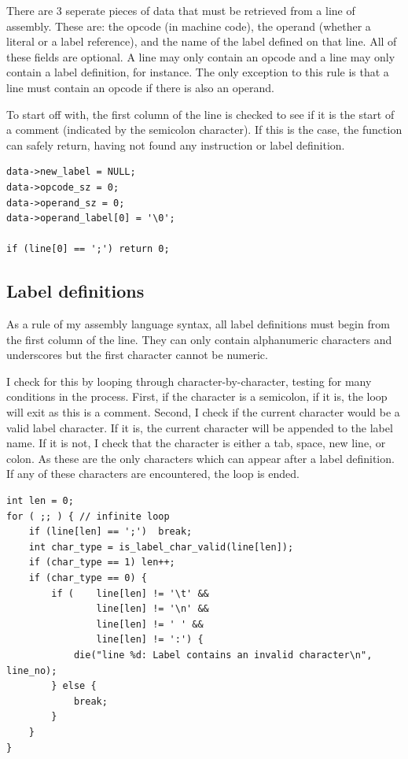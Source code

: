 \documentclass[a4paper]{report}
\begin{document}
There are 3 seperate pieces of data that must be retrieved from a line of
assembly. These are: the opcode (in machine code), the operand (whether a
literal or a label reference), and the name of the label defined on that line.
All of these fields are optional. A line may only contain an opcode and a line
may only contain a label definition, for instance. The only exception to this
rule is that a line must contain an opcode if there is also an operand.

To start off with, the first column of the line is checked to see if it is the
start of a comment (indicated by the semicolon character). If this is the case,
the function can safely return, having not found any instruction or label
definition.

\begin{lstlisting}
data->new_label = NULL;
data->opcode_sz = 0;
data->operand_sz = 0;
data->operand_label[0] = '\0';

if (line[0] == ';') return 0;
\end{lstlisting}

\subsection{Label definitions}

As a rule of my assembly language syntax, all label definitions must begin from
the first column of the line. They can only contain alphanumeric characters and
underscores but the first character cannot be numeric.

I check for this by looping through character-by-character, testing for many
conditions in the process. First, if the character is a semicolon, if it is,
the loop will exit as this is a comment. Second, I check if the current
character would be a valid label character. If it is, the current character will
be appended to the label name. If it is not, I check that the character is
either a tab, space, new line, or colon. As these are the only characters which
can appear after a label definition. If any of these characters are encountered,
the loop is ended.

\begin{lstlisting}
int len = 0;
for ( ;; ) { // infinite loop
	if (line[len] == ';')  break;
	int char_type = is_label_char_valid(line[len]);
	if (char_type == 1) len++;
	if (char_type == 0) {
		if (	line[len] != '\t' &&
				line[len] != '\n' &&
				line[len] != ' ' &&
				line[len] != ':') {
			die("line %d: Label contains an invalid character\n", line_no);
		} else {
			break;
		}
	}
}
\end{lstlisting}
\end{document}
